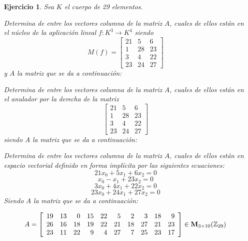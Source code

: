 \documentclass[12pt]{amsart}
\newtheorem{ejer}{Ejercicio}
\begin{document}
\begin{ejer} Sea $K$ el cuerpo de 29 elementos.
\newline
\noindent\begin{minipage}{\textwidth}
\begin{tcolorbox}[colback = green!20!white,title=Versión Núcleo]
Determina de entre los vectores columna de la matriz $A$, cuales de ellos están en el núcleo de la aplicación lineal $f:K^{3} \to K^{4}$ siendo  $$ M(f) = \left[\begin{array}{rrr}
21 & 5 & 6 \\
1 & 28 & 23 \\
3 & 4 & 22 \\
23 & 24 & 27
\end{array}\right] $$ y $A$ la matriz que se da a continuación:\end{tcolorbox}
\end{minipage} \newline
\noindent\begin{minipage}{\textwidth}
\begin{tcolorbox}[colback = blue!20!white,title=Versión Anulador]
Determina de entre los vectores columna de la matriz $A$, cuales de ellos están en el anulador por la derecha de la matriz $$ \left[\begin{array}{rrr}
21 & 5 & 6 \\
1 & 28 & 23 \\
3 & 4 & 22 \\
23 & 24 & 27
\end{array}\right] $$ siendo $A$ la matriz que se da a continuación:\end{tcolorbox}
\end{minipage} \newline
\noindent\begin{minipage}{\textwidth} 
\begin{tcolorbox}[colback = red!20!white,title=Versión Ecuaciones Implícitas]
Determina de entre los vectores columna de la matriz $A$, cuales de ellos están en espacio vectorial definido en forma implícita por las siguientes ecuaciones:
\[ 21 x_{0} + 5 x_{1} + 6 x_{2} = 0 \]
\[ x_{0} - x_{1} + 23 x_{2} = 0 \]
\[ 3 x_{0} + 4 x_{1} + 22 x_{2} = 0 \]
\[ 23 x_{0} + 24 x_{1} + 27 x_{2} = 0 \]
Siendo $A$ la matriz que se da a continuación:
\end{tcolorbox}
\end{minipage}
\[ A = \left[\begin{array}{rrrrrrrrrr}
19 & 13 & 0 & 15 & 22 & 5 & 2 & 3 & 18 & 9 \\
26 & 16 & 18 & 19 & 22 & 21 & 18 & 27 & 21 & 23 \\
23 & 11 & 22 & 9 & 4 & 27 & 7 & 25 & 23 & 17
\end{array}\right] \in {\bf M}_{3\times 10}({\mathbb Z}_{29})\]
\end{ejer}
\end{document}
